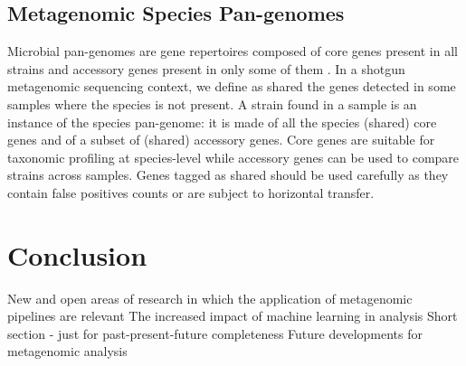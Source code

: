 \documentclass{article}
\begin{document}
\subsection*{Metagenomic Species Pan-genomes}
Microbial pan-genomes are gene repertoires composed of core genes present in all strains and accessory genes present in only some of them \cite{tettelin2005genome}.
In a shotgun metagenomic sequencing context, we define as shared the genes detected in some samples where the species is not present.
A strain found in a sample is an instance of the species pan-genome: it is made of all the species (shared) core genes and of a subset of (shared) accessory genes.
Core genes are suitable for taxonomic profiling at species-level while accessory genes can be used to compare strains across samples.
Genes tagged as shared should be used carefully as they contain false positives counts or are subject to horizontal transfer.
 
\section*{Conclusion}
New and open areas of research in which the application of metagenomic pipelines are relevant
The increased impact of machine learning in analysis
Short section - just for past-present-future completeness
Future developments for metagenomic analysis



\end{document}
